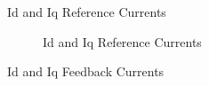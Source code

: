 \begin{frame}{Id and Iq Reference Currents}
	\begin{figure}
		\centering


		\caption{Id and Iq Reference Currents}
	\end{figure}
\end{frame}

\begin{frame}{Id and Iq Feedback Currents}
	\begin{figure}
		\centering


	\end{figure}
\end{frame}

